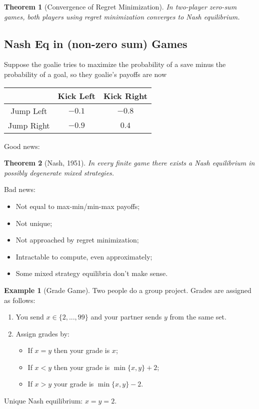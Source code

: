 \documentclass[dvipsnames]{article}
\newtheorem{theorem}{Theorem}[section]
\theoremstyle{definition}
\newtheorem{example}[definition]{Example}
\theoremstyle{remark}
\begin{document}
\begin{theorem}[Convergence of Regret Minimization]
	In two-player zero-sum games, both players using regret minimization converges to Nash equilibrium. 
\end{theorem}

\subsection{Nash Eq in (non-zero sum) Games}

Suppose the goalie tries to maximize the probability of a save minus the probability of a goal, so they goalie's payoffs are now
\begin{table}[h]\centering
	\begin{tabular}{c|c|c|}
		& Kick Left & Kick Right \\ \hline
		Jump Left & $-0.1$ & $-0.8$  \\ \hline
		Jump Right & $-0.9$ & $0.4$ \\ \hline
	\end{tabular}
\end{table}

Good news:

\begin{theorem}[Nash, 1951]
	In every finite game there exists a Nash equilibrium in possibly degenerate mixed strategies.
\end{theorem}

Bad news:
\begin{itemize}
	\item Not equal to max-min/min-max payoffs;
	\item Not unique;
	\item Not approached by regret minimization;
	\item Intractable to compute, even approximately;
	\item Some mixed strategy equilibria don't make sense.
\end{itemize}

\begin{example}[Grade Game]
	Two people do a group project. Grades are assigned as follows:
	\begin{enumerate}
		\item You send $x \in \{2,...,99\}$ and your partner sends $y$ from the same set.
		\item Assign grades by:
		\begin{itemize}
			\item If $x = y$ then your grade is $x$;
			\item If $x < y$ then your grade is $\min \{x,y\}+2$;
			\item If $x > y$ your grade is $\min \{x,y\}-2$.
		\end{itemize}
	\end{enumerate}
	Unique Nash equilibrium: $x = y = 2$.
\end{example}
\end{document}
